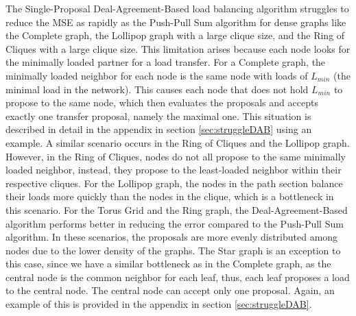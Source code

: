 The Single-Proposal Deal-Agreement-Based load balancing algorithm struggles to reduce the MSE as rapidly as the Push-Pull Sum algorithm for dense graphs like the Complete graph, the Lollipop graph with a large clique size, and the Ring of Cliques with a large clique size. This limitation arises because each node looks for the minimally loaded partner for a load transfer. For a Complete graph, the minimally loaded neighbor for each node is the same node with loads of $L_{min}$ (the minimal load in the network). This causes each node that does not hold $L_{min}$ to propose to the same node, which then evaluates the proposals and accepts exactly one transfer proposal, namely the maximal one. This situation is described in detail in the appendix in section \ref{sec:struggleDAB} using an example. A similar scenario occurs in the Ring of Cliques and the Lollipop graph. However, in the Ring of Cliques, nodes do not all propose to the same minimally loaded neighbor, instead, they propose to the least-loaded neighbor within their respective cliques. For the Lollipop graph, the nodes in the path section balance their loads more quickly than the nodes in the clique, which is a bottleneck in this scenario. For the Torus Grid and the Ring graph, the Deal-Agreement-Based algorithm performs better in reducing the error compared to the Push-Pull Sum algorithm. In these scenarios, the proposals are more evenly distributed among nodes due to the lower density of the graphs. The Star graph is an exception to this case, since we have a similar bottleneck as in the Complete graph, as the central node is the common neighbor for each leaf, thus, each leaf proposes a load to the central node. The central node can accept only one proposal. Again, an example of this is provided in the appendix in section \ref{sec:struggleDAB}.

